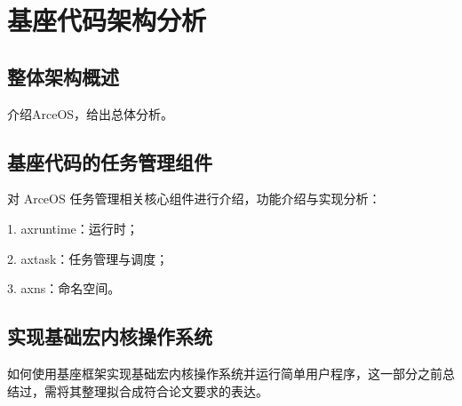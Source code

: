 
\chapter{基座代码架构分析}

\section{整体架构概述}

介绍ArceOS，给出总体分析。



\section{基座代码的任务管理组件}

对 ArceOS 任务管理相关核心组件进行介绍，功能介绍与实现分析：

1. axruntime：运行时；

2. axtask：任务管理与调度；

3. axns：命名空间。



\section{实现基础宏内核操作系统}

如何使用基座框架实现基础宏内核操作系统并运行简单用户程序，这一部分之前总结过，需将其整理拟合成符合论文要求的表达。
